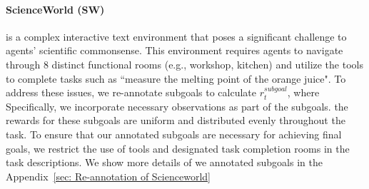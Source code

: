\paragraph{ScienceWorld (SW)~\citep{wang2022scienceworld}} 
is a complex interactive text environment that poses a significant challenge to agents' scientific commonsense. This environment requires agents to navigate through 8 distinct functional rooms (e.g., workshop, kitchen) and utilize the tools to complete tasks such as ``measure the melting point of the orange juice". 
To address these issues, we re-annotate subgoals to calculate $r_t^{subgoal}$, where
Specifically, we incorporate necessary observations as part of the subgoals. 
the rewards for these subgoals are uniform and distributed evenly throughout the task. 
To ensure that our annotated subgoals are necessary for achieving final goals, we restrict the use of tools and designated task completion rooms in the task descriptions. 
We show more details of we annotated subgoals in the Appendix~\ref{sec: Re-annotation of Scienceworld}%


